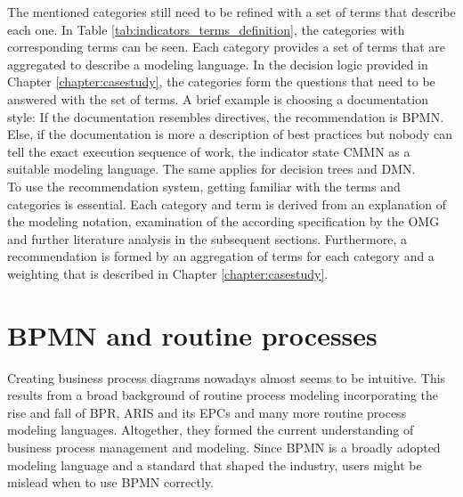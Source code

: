 %

The mentioned categories still need to be refined with a set of terms that describe each one. In Table \ref{tab:indicators_terms_definition}, the categories with corresponding terms can be seen. Each category provides a set of terms that are aggregated to describe a modeling language. In the decision logic provided in Chapter \ref{chapter:casestudy}, the categories form the questions that need to be answered with the set of terms. A brief example is choosing a documentation style: If the documentation resembles directives, the recommendation is BPMN. Else, if the documentation is more a description of best practices but nobody can tell the exact execution sequence of work, the indicator state CMMN as a suitable modeling language. The same applies for decision trees and DMN.\\
To use the recommendation system, getting familiar with the terms and categories is essential. Each category and term is derived from an explanation of the modeling notation, examination of the according specification by the OMG and further literature analysis in the subsequent sections. Furthermore, a recommendation is formed by an aggregation of terms for each category and a weighting that is described in Chapter \ref{chapter:casestudy}.

\section{BPMN and routine processes}
\label{section:BPMNindicators}
Creating business process diagrams nowadays almost seems to be intuitive. This results from a broad background of routine process modeling incorporating the rise and fall of BPR, ARIS and its EPCs and many more routine process modeling languages. Altogether, they formed the current understanding of business process management and modeling. 
Since BPMN is a broadly adopted modeling language and a standard that shaped the industry, users might be mislead when to use BPMN correctly.  


